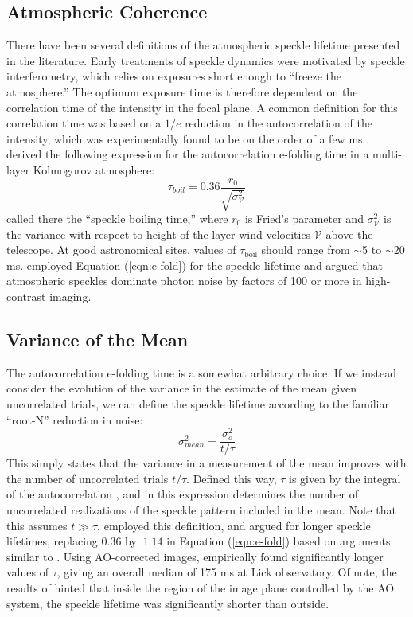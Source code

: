 \documentclass[10pt,preprint]{aastex631}
\begin{document}
\subsection{Atmospheric Coherence}
There have been several definitions of the atmospheric speckle lifetime presented in the literature.  Early treatments of speckle dynamics were motivated by speckle interferometry, which relies on exposures short enough to ``freeze the atmosphere.''  The optimum exposure time is therefore dependent on the correlation time of the intensity in the focal plane.  A common definition for this correlation time was based on a $1/e$ reduction in the autocorrelation of the intensity, which was experimentally found to be on the order of a few ms \citep{1978ApOpt..17.3779S,1990JMOp...37.1247D}.    \citet{1982JOpt...13..263R} derived the following expression for the autocorrelation e-folding time in a multi-layer Kolmogorov atmosphere:
\begin{equation}
\tau_{boil} = 0.36 \frac{r_0}{\sqrt{\sigma^2_\mathcal{V}}}
\label{eqn:e-fold}
\end{equation}
called there the ``speckle boiling time,'' where $r_0$ is Fried's parameter and $\sigma^2_\mathcal{V}$ is the variance with respect to height of the layer wind velocities $\mathcal{V}$  above the telescope.  At good astronomical sites, values of $\tau_\text{boil}$ should range from $\sim$5 to $\sim$20 ms. \citet{1999PASP..111..587R} employed Equation (\ref{eqn:e-fold}) for the speckle lifetime and argued that atmospheric speckles dominate photon noise by factors of 100 or more in high-contrast imaging.

\subsection{Variance of the Mean}
The autocorrelation e-folding time is a somewhat arbitrary choice.  If we instead consider the evolution of the variance in the estimate of the mean given uncorrelated trials, we can define the speckle lifetime according to the familiar ``root-N'' reduction in noise:
\begin{equation}
\sigma_{mean}^2 = \frac{\sigma_o^2}{t/\tau}
\label{eqn:varmean_def_intro}
\end{equation}
This simply states that the variance in a measurement of the mean improves with the number of uncorrelated trials $t/\tau$.  Defined this way, $\tau$ is given by the integral of the autocorrelation \citep{2006ApJ...637..541F}, and in this expression determines the number of uncorrelated realizations of the speckle pattern included in the mean.  Note that this assumes $t \gg \tau$.  \citet{1986JOSAA...3.1001A} employed this definition, and argued for longer speckle lifetimes, replacing $0.36$ by $~$$1.14$ in Equation (\ref{eqn:e-fold}) based on arguments similar to \citet{1982JOpt...13..263R}.  Using AO-corrected images, \citet{2006ApJ...637..541F} empirically found significantly longer values of $\tau$, giving an overall median of 175 ms at Lick observatory.  Of note, the results of \citet{2006ApJ...637..541F} hinted that inside the region of the image plane controlled by the AO system, the speckle lifetime was significantly shorter than outside.
\end{document}
